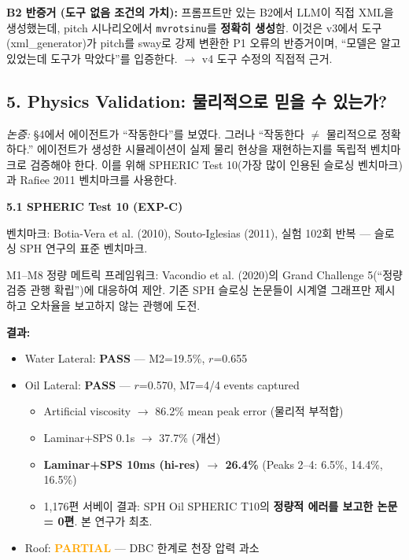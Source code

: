 \documentclass[12pt,a4paper]{article}
\begin{document}
\textbf{B2 반증거 (도구 없음 조건의 가치):}
프롬프트만 있는 B2에서 LLM이 직접 XML을 생성했는데,
pitch 시나리오에서 \texttt{mvrotsinu}를 \textbf{정확히 생성}함.
이것은 v3에서 도구(xml\_generator)가 pitch를 sway로 강제 변환한 P1 오류의
반증거이며, ``모델은 알고 있었는데 도구가 막았다''를 입증한다.
$\rightarrow$ v4 도구 수정의 직접적 근거.

\subsection{5. Physics Validation: 물리적으로 믿을 수 있는가?}

\textit{논증:} §4에서 에이전트가 ``작동한다''를 보였다.
그러나 ``작동한다 $\neq$ 물리적으로 정확하다.''
에이전트가 생성한 시뮬레이션이 실제 물리 현상을 재현하는지를
독립적 벤치마크로 검증해야 한다.
이를 위해 SPHERIC Test 10(가장 많이 인용된 슬로싱 벤치마크)과
Rafiee 2011 벤치마크를 사용한다.

\textbf{5.1 SPHERIC Test 10 (EXP-C)}

벤치마크: Botia-Vera et al. (2010), Souto-Iglesias (2011),
실험 102회 반복 --- 슬로싱 SPH 연구의 표준 벤치마크.

M1--M8 정량 메트릭 프레임워크:
Vacondio et al. (2020)의 Grand Challenge 5(``정량 검증 관행 확립'')에 대응하여 제안.
기존 SPH 슬로싱 논문들이 시계열 그래프만 제시하고 오차율을 보고하지 않는 관행에 도전.

\textbf{결과:}
\begin{itemize}[nosep]
\item Water Lateral: \textbf{\textcolor{pass}{PASS}} --- M2=19.5\%, $r$=0.655
\item Oil Lateral: \textbf{\textcolor{pass}{PASS}} --- $r$=0.570, M7=4/4 events captured
  \begin{itemize}[nosep]
  \item Artificial viscosity $\rightarrow$ 86.2\% mean peak error (물리적 부적합)
  \item Laminar+SPS 0.1s $\rightarrow$ 37.7\% (개선)
  \item \textbf{Laminar+SPS 10ms (hi-res) $\rightarrow$ 26.4\%} (Peaks 2--4: 6.5\%, 14.4\%, 16.5\%)
  \item 1,176편 서베이 결과: SPH Oil SPHERIC T10의 \textbf{정량적 에러를 보고한 논문 = 0편}. 본 연구가 최초.
  \end{itemize}
\item Roof: \textcolor{orange}{\textbf{PARTIAL}} --- DBC 한계로 천장 압력 과소
\end{itemize}
\end{document}
